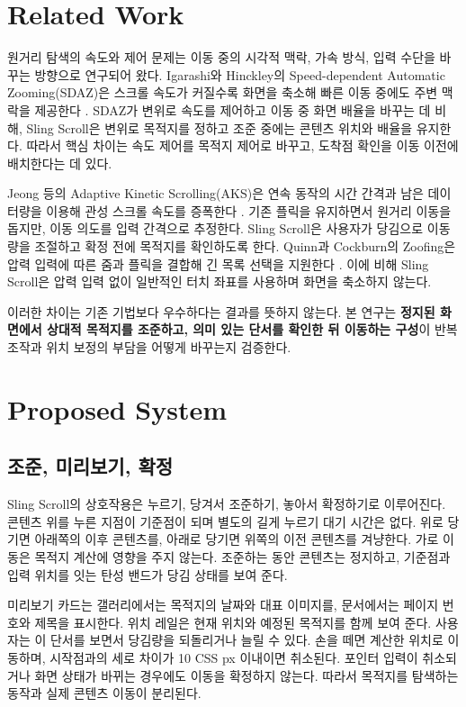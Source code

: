 \documentclass[manuscript,review,nonacm]{acmart}
\begin{document}
\section{Related Work}

원거리 탐색의 속도와 제어 문제는 이동 중의 시각적 맥락, 가속 방식, 입력 수단을 바꾸는 방향으로 연구되어 왔다. Igarashi와 Hinckley의 Speed-dependent Automatic Zooming(SDAZ)은 스크롤 속도가 커질수록 화면을 축소해 빠른 이동 중에도 주변 맥락을 제공한다 \cite{igarashi2000sdaz}. SDAZ가 변위로 속도를 제어하고 이동 중 화면 배율을 바꾸는 데 비해, Sling Scroll은 변위로 목적지를 정하고 조준 중에는 콘텐츠 위치와 배율을 유지한다. 따라서 핵심 차이는 속도 제어를 목적지 제어로 바꾸고, 도착점 확인을 이동 이전에 배치한다는 데 있다.

Jeong 등의 Adaptive Kinetic Scrolling(AKS)은 연속 동작의 시간 간격과 남은 데이터량을 이용해 관성 스크롤 속도를 증폭한다 \cite{jeong2018aks}. 기존 플릭을 유지하면서 원거리 이동을 돕지만, 이동 의도를 입력 간격으로 추정한다. Sling Scroll은 사용자가 당김으로 이동량을 조절하고 확정 전에 목적지를 확인하도록 한다. Quinn과 Cockburn의 Zoofing은 압력 입력에 따른 줌과 플릭을 결합해 긴 목록 선택을 지원한다 \cite{quinn2009zoofing}. 이에 비해 Sling Scroll은 압력 입력 없이 일반적인 터치 좌표를 사용하며 화면을 축소하지 않는다.

이러한 차이는 기존 기법보다 우수하다는 결과를 뜻하지 않는다. 본 연구는 \textbf{정지된 화면에서 상대적 목적지를 조준하고, 의미 있는 단서를 확인한 뒤 이동하는 구성}이 반복 조작과 위치 보정의 부담을 어떻게 바꾸는지 검증한다.

\section{Proposed System}

\subsection{조준, 미리보기, 확정}

Sling Scroll의 상호작용은 누르기, 당겨서 조준하기, 놓아서 확정하기로 이루어진다. 콘텐츠 위를 누른 지점이 기준점이 되며 별도의 길게 누르기 대기 시간은 없다. 위로 당기면 아래쪽의 이후 콘텐츠를, 아래로 당기면 위쪽의 이전 콘텐츠를 겨냥한다. 가로 이동은 목적지 계산에 영향을 주지 않는다. 조준하는 동안 콘텐츠는 정지하고, 기준점과 입력 위치를 잇는 탄성 밴드가 당김 상태를 보여 준다.

미리보기 카드는 갤러리에서는 목적지의 날짜와 대표 이미지를, 문서에서는 페이지 번호와 제목을 표시한다. 위치 레일은 현재 위치와 예정된 목적지를 함께 보여 준다. 사용자는 이 단서를 보면서 당김량을 되돌리거나 늘릴 수 있다. 손을 떼면 계산한 위치로 이동하며, 시작점과의 세로 차이가 10 CSS px 이내이면 취소된다. 포인터 입력이 취소되거나 화면 상태가 바뀌는 경우에도 이동을 확정하지 않는다. 따라서 목적지를 탐색하는 동작과 실제 콘텐츠 이동이 분리된다.
\end{document}
